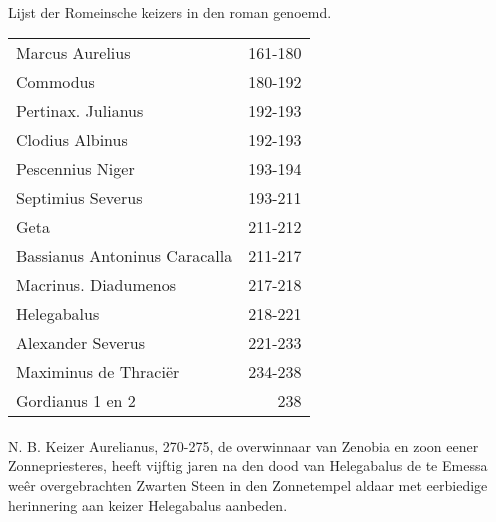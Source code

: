 \documentclass[a4paper, 12pt, oneside, dutch]{article}
\begin{document}
\paragraph{}
Lijst der Romeinsche keizers in den roman genoemd.  
\begin{table}[h]
    \centering
    \begin{tabular}{l r}
         Marcus Aurelius	& 161-180 \\
        Commodus & 180-192 \\
        Pertinax. Julianus & 192-193 \\
        Clodius Albinus	& 192-193 \\
        Pescennius Niger & 193-194 \\
        Septimius Severus & 193-211 \\
        Geta & 211-212 \\
        Bassianus Antoninus Caracalla & 211-217 \\
        Macrinus. Diadumenos & 217-218 \\
        Helegabalus	& 218-221 \\
        Alexander Severus & 221-233 \\
        Maximinus de Thraciër & 234-238 \\
        Gordianus 1 en 2 & 238 \\
    \end{tabular}
\end{table}
\paragraph{}
N. B. Keizer Aurelianus, 270-275, de overwinnaar van Zenobia en zoon eener Zonnepriesteres, heeft vijftig jaren na den dood van Helegabalus de te Emessa weêr overgebrachten Zwarten Steen in den Zonnetempel aldaar met eerbiedige herinnering aan keizer Helegabalus aanbeden.
\clearpage
\end{document}
